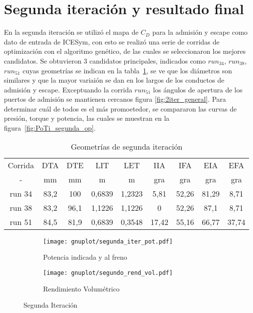 \section{Segunda iteración y resultado final}
%
En la segunda iteración se utilizó el mapa de $C_D$ para la admisión y escape
como dato de entrada de ICESym, con esto se realizó una serie de corridas de
optimización con el algoritmo genético, de las cuales se seleccionaron los
mejores candidatos.
%
Se obtuvieron 3 candidatos principales, indicados como \emph{$run_{34}$},
\emph{$run_{38}$}, \emph{$run_{51}$} cuyas geometrías se indican en la
tabla~\ref{tab:2iter_geom}, se ve que los diámetros son similares y que la mayor variaión
se dan en los largos de los conductos de admisión y escape.
%
Exceptuando la corrida $run_{51}$ los ángulos de apertura de los puertos de
admisión se mantienen cercanos figura \ref{fig:2iter_general}.
%
Para determinar cuál de todos es el más promoetedor, se compararon las curvas de
presión, torque y potencia, las cuales se muestran en la
figura~\ref{fig:PoTi_segunda_op}.

\begin{table}
\centering
\begin{tabular}{ccccccccc} \toprule
  Corrida & DTA  & DTE  & LIT    & LET    & IIA   & IFA   & EIA   & EFA \\
  -       & mm   & mm   & m      & m      & gra   & gra   & gra   & gra \\ \midrule
  run 34  & 83,2 & 100  & 0,6839 & 1,2323 & 5,81  & 52,26 & 81,29 & 8,71 \\
  run 38  & 83,2 & 96,1 & 1,1226 & 1,1226 & 0     & 52,26 & 87,1  & 8,71 \\
  run 51  & 84,5 & 81,9 & 0,6839 & 0,3548 & 17,42 & 55,16 & 66,77 & 37,74 \\
\end{tabular}
\caption{Geometrías de segunda iteración}\label{tab:2iter_geom}
\end{table}

\begin{figure}[ht]
  \centering
  \begin{subfigure}[b]{.5\textwidth}
    \centering
    \texttt{[image: gnuplot/segunda\_iter\_pot.pdf]}
    \caption{Potencia indicada y al freno} \label{fig:primer_op}
  \end{subfigure}%
  \begin{subfigure}[b]{.5\textwidth}
    \centering
    \texttt{[image: gnuplot/segundo\_rend\_vol.pdf]}
    \caption{Rendimiento Volumétrico}
  \end{subfigure}
    \caption{Segunda Iteración} \label{fig:primer_op}
\end{figure}


